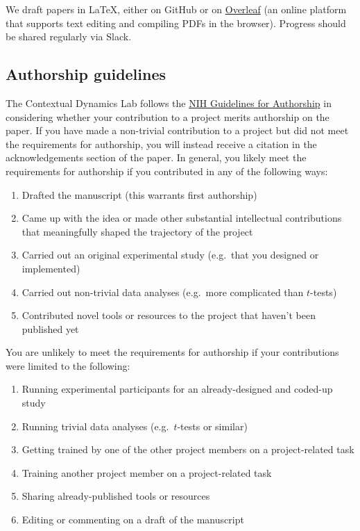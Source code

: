 \documentclass{tufte-book} %
\begin{document}
We draft papers in \LaTeX, either on GitHub or on
\href{https://www.overleaf.com/}{Overleaf} (an online platform that
supports text editing and compiling PDFs in the browser).  Progress
should be shared regularly via Slack.

\subsection{Authorship guidelines}
  The Contextual Dynamics Lab follows
the
\href{https://oir.nih.gov/sites/default/files/uploads/sourcebook/documents/ethical_conduct/guidelines-authorship_contributions.pdf}{NIH
  Guidelines for Authorship} in considering whether your contribution
to a project merits authorship on the paper.  If you have made a
non-trivial contribution to a project but did not meet the
requirements for authorship, you will instead receive a citation in
the acknowledgements section of the paper.  In general, you likely
meet the requirements for authorship if you contributed in any of the
following ways:
\begin{enumerate}
\item Drafted the manuscript (this warrants first authorship)
\item Came up with the idea or made other substantial intellectual
  contributions that meaningfully shaped the trajectory of the project
\item Carried out an original experimental study (e.g.\ that you
  designed or implemented)
\item Carried out non-trivial data analyses (e.g.\ more complicated
  than $t$-tests)
\item Contributed novel tools or resources to the project that haven't
  been published yet
\end{enumerate}

  You are unlikely to
meet the requirements for authorship if your contributions were
limited to the following:
\begin{enumerate}
  \item Running experimental participants for an already-designed and
    coded-up study
  \item Running trivial data analyses (e.g.\ $t$-tests or similar)
  \item Getting trained by one of the other project members on a
    project-related task
  \item Training another project member on a project-related task
  \item Sharing already-published tools or resources
  \item Editing or commenting on a draft of the manuscript
\end{enumerate}
\end{document}
